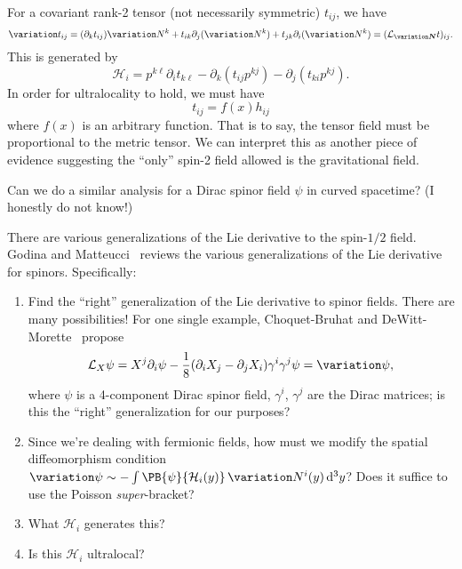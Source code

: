 For a covariant rank-2 tensor (not necessarily symmetric) $t_{ij}$, we
have
\begin{equation}
\variation t_{ij} = (\partial_{k}t_{ij})\variation N^{k}
+ t_{ik}\partial_{j}(\variation N^{k})
+ t_{jk}\partial_{i}(\variation N^{k})
= (\LieD_{\variation\vec{N}}t)_{ij}.
\end{equation}
This is generated by
\begin{equation}
\mathcal{H}_{i} = p^{k\ell}\partial_{i}t_{k\ell}-\partial_{k}(t_{ij}p^{kj})-\partial_{j}(t_{ki}p^{kj}).
\end{equation}
In order for ultralocality to hold, we must have
\begin{equation}
t_{ij} = f(x)h_{ij}
\end{equation}
where $f(x)$ is an arbitrary function. That is to say, the tensor field
must be proportional to the metric tensor. We can interpret this as
another piece of evidence suggesting the ``only'' spin-2 field allowed
is the gravitational field.

\begin{exercise}[Fermions]
  Can we do a similar analysis for a Dirac spinor field $\psi$ in curved
  spacetime? (I honestly do not know!)
  
  There are various generalizations of the Lie derivative to the
  spin-$1/2$ field. Godina and Matteucci~\cite{Godina:2005mt} reviews the various
  generalizations of the Lie derivative for spinors.  Specifically:
\begin{enumerate}
\item Find the ``right'' generalization of the Lie derivative to spinor
  fields. There are many possibilities! For one single example,
  Choquet-Bruhat and DeWitt-Morette~\cite{Choquet-Bruhat:2000amp2} propose
  \[\LieD_{X}\psi = X^{j}\partial_{i}\psi - \frac{1}{8}(\partial_{i}X_{j}-\partial_{j}X_{i})\gamma^{i}\gamma^{j}\psi = \variation\psi,\]
  where $\psi$ is a 4-component Dirac spinor field,
  $\gamma^{i}$, $\gamma^{j}$ are the Dirac matrices; is this the
  ``right'' generalization for our purposes?
\item Since we're dealing with
  fermionic fields, how must we modify the spatial diffeomorphism
  condition
  $\variation\psi\sim-\int\PB{\psi}{\mathcal{H}_{i}(y)}\,\variation N^{i}(y)\,\D^{3}y$?
  Does it suffice to use the Poisson \emph{super}-bracket?
\item What $\mathcal{H}_{i}$ generates this? 
\item Is this $\mathcal{H}_{i}$ ultralocal?
\end{enumerate}
\end{exercise}

